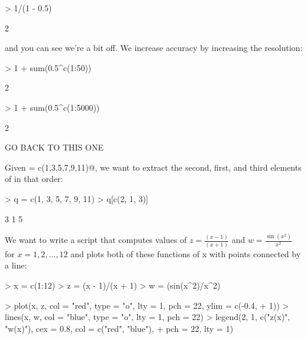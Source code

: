 \documentclass[11pt, oneside, reqno]{article}
\begin{document}
\begin{Schunk}
\begin{Sinput}
> 1/(1 - 0.5)
\end{Sinput}
\begin{Soutput}
[1] 2
\end{Soutput}
\end{Schunk}

and you can see we're a bit off. We increase accuracy by increasing the resolution:

\begin{Schunk}
\begin{Sinput}
> 1 + sum(0.5^c(1:50))
\end{Sinput}
\begin{Soutput}
[1] 2
\end{Soutput}
\begin{Sinput}
> 1 + sum(0.5^c(1:5000))
\end{Sinput}
\begin{Soutput}
[1] 2
\end{Soutput}
\end{Schunk}

GO BACK TO THIS ONE
\eans

Given \verb@q = c(1,3,5,7,9,11)@, we want to extract the second, first, and third elements of \verb@q@ in that order:

\begin{Schunk}
\begin{Sinput}
> q = c(1, 3, 5, 7, 9, 11)
> q[c(2, 1, 3)]
\end{Sinput}
\begin{Soutput}
[1] 3 1 5
\end{Soutput}
\end{Schunk}

\eans

We want to write a script that computes values of $z=\frac{(x-1)}{(x+1)}$ and $w=\frac{\sin(x^2)}{x^2}$ for $x=1,2,\ldots,12$ and plots both of these functions of x with points connected by a line:


\begin{Schunk}
\begin{Sinput}
> x = c(1:12)
> z = (x - 1)/(x + 1)
> w = (sin(x^2)/x^2)
\end{Sinput}
\end{Schunk}

\begin{Schunk}
\begin{Sinput}
> plot(x, z, col = "red", type = "o", lty = 1, pch = 22, ylim = c(-0.4, 
+     1))
> lines(x, w, col = "blue", type = "o", lty = 1, pch = 22)
> legend(2, 1, c("z(x)", "w(x)"), cex = 0.8, col = c("red", "blue"), 
+     pch = 22, lty = 1)
\end{Sinput}
\end{Schunk}
\end{document}
